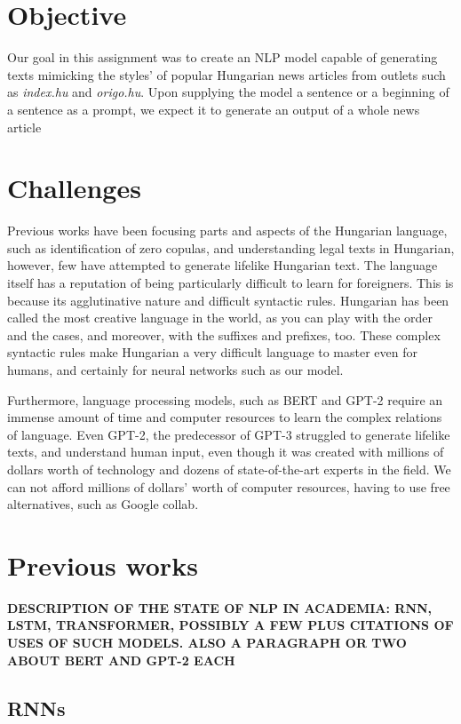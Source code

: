 \documentclass[journal]{IEEEtai}
\begin{document}
\section{Objective}
Our goal in this assignment was to create an NLP model capable of generating texts mimicking  the styles' of popular Hungarian news articles from outlets such as {\it index.hu} and {\it origo.hu}. Upon supplying the model a sentence or a beginning of a sentence as a prompt, we expect it to generate an output of a whole news article

\section{Challenges}
Previous works have been focusing parts and aspects of the Hungarian language, such as identification of zero copulas\cite{Dmtr2020MuchAA}, and understanding legal texts in Hungarian\cite{gorog2019legal}, however, few have attempted to generate lifelike Hungarian text. The language itself has a reputation of being particularly difficult to learn for foreigners. This is because its agglutinative nature and difficult syntactic rules. Hungarian has been called the most creative language in the world, as you can play with the order and the cases, and moreover, with the suffixes and prefixes, too. These complex syntactic rules make Hungarian a very difficult language to master even for humans, and certainly for neural networks such as our model.

Furthermore, language processing models, such as BERT and GPT-2 require an immense amount of time and computer resources to learn the complex relations of language. Even GPT-2, the predecessor of GPT-3 struggled to generate lifelike texts, and understand human input, even though it was created with millions of dollars worth of technology and dozens of state-of-the-art experts in the field. We can not afford millions of dollars' worth of computer resources, having to use free alternatives, such as Google collab.

\section{Previous works}
\textbf{DESCRIPTION OF THE STATE OF NLP IN ACADEMIA: RNN, LSTM, TRANSFORMER, POSSIBLY A FEW PLUS CITATIONS OF USES OF SUCH MODELS. ALSO A PARAGRAPH OR TWO ABOUT BERT AND GPT-2 EACH}

\subsection{RNNs}
\end{document}
